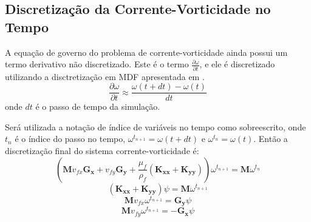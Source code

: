 \subsection{\textbf{Discretização da Corrente-Vorticidade no Tempo}}
A equação de governo  do problema de corrente-vorticidade ainda possui um termo derivativo não discretizado.
Este é o termo $\tfrac{\partial \omega}{\partial t}$, e ele é discretizado utilizando a disctretização em MDF apresentada em .
 \begin{equation}
    \dfrac{\partial \omega}{\partial t} \approx
    \frac{
        \omega(t + dt) -
        \omega(t)
    }{dt}
\end{equation}
onde $dt$ é o passo de tempo da simulação.

Será utilizada a notação de índice de variáveis no tempo como sobreescrito, onde $t_n$ é o índice do passo no tempo, $\omega^{t_{n+1}} = \omega(t + dt)$ e $\omega^{t_{n}} = \omega(t)$.
Então a discretização final do sistema corrente-vorticidade é:
\begin{equation}
    \left(
        \mathbf{M}
        v_{fx}
        \mathbf{G_x}+
        v_{fy}
        \mathbf{G_y} +
        \dfrac{\mu_f}{\rho_f}
        \left(
        \mathbf{K_{xx}} +
        \mathbf{K_{yy}}
        \right)
    \right)
    \omega^{t_{n+1}} = 
    \mathbf{M}
    \omega^{t_{n}}
    \label{last_w}
\end{equation}
\begin{equation}
    \left(
    \mathbf{K_{xx}} +
    \mathbf{K_{yy}}
    \right)
    \psi =
    \mathbf{M}
    \omega^{t_{n+1}}
    \label{last_psi}
\end{equation}
\begin{equation}
    \mathbf{M}
    v_{fx}
    \omega^{t_{n+1}} =
    \mathbf{G_y}
    \psi
    \label{last_vx}
\end{equation}
\begin{equation}
    \mathbf{M}
    v_{fy}
    \omega^{t_{n+1}} = -
    \mathbf{G_x}
    \psi
    \label{last_vy}
\end{equation}

